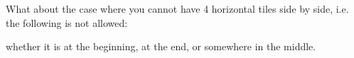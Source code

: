   What about the case where you cannot have 4 horizontal tiles side by side,
  i.e. the following is not allowed:

whether it is at the beginning, at the end, or somewhere in the middle.
